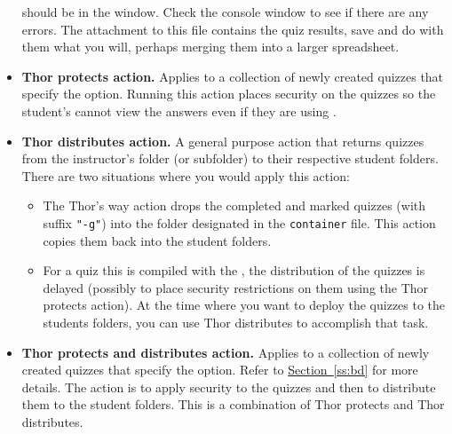 \documentclass{article}
\begin{document}
\begin{itemize}
          should be in the  window. Check the console window
          to see if there are any errors. The attachment to this file
          contains the quiz results, save and do with them what you will,
          perhaps merging them into a larger spreadsheet.
  \item \textbf{\textsf{Thor protects} action.} Applies to a collection of
      newly created quizzes that specify the  option.
      Running this action places security on the quizzes so the student's
      cannot view the answers even if they are using .
  \item \textbf{\textsf{Thor distributes} action.} A general purpose action
      that returns quizzes from the instructor's folder (or subfolder) to their
      respective student folders. There are two situations where you would apply
      this action:
      \begin{itemize}
        \item The \textsf{Thor's way} action drops the completed and
            marked quizzes (with suffix \texttt{"-g"}) into the folder
            designated in the \texttt{container} file. This action copies
            them back into the student folders.
        \item For a quiz this is compiled with the , the
            distribution of the quizzes is delayed (possibly to place
            security restrictions on them using the \textsf{Thor
            protects} action). At the time where you want to deploy the
            quizzes to the students folders, you can use \textsf{Thor
            distributes} to accomplish that task.
      \end{itemize}
  \item \textbf{\textsf{Thor protects and distributes} action.} Applies to
      a collection of newly created quizzes that specify the
       option. Refer to
      \hyperref[ss:bd]{Section~\ref{ss:bd}} for more details. The action is
      to apply security to the quizzes and then to distribute them to the
      student folders. This is a combination of \textsf{Thor protects} and
      \textsf{Thor distributes}.


\end{itemize}
\end{document}
